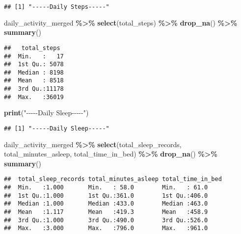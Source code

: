 \documentclass[
]{article}
\newenvironment{Shaded}{\begin{snugshade}}{\end{snugshade}}
\newcommand{\FunctionTok}[1]{\textcolor[rgb]{0.13,0.29,0.53}{\textbf{#1}}}
\newcommand{\NormalTok}[1]{#1}
\newcommand{\SpecialCharTok}[1]{\textcolor[rgb]{0.81,0.36,0.00}{\textbf{#1}}}
\newcommand{\StringTok}[1]{\textcolor[rgb]{0.31,0.60,0.02}{#1}}
\begin{document}
\begin{verbatim}
## [1] "-----Daily Steps-----"
\end{verbatim}

\begin{Shaded}
\begin{Highlighting}[]
\NormalTok{daily\_activity\_merged }\SpecialCharTok{\%\textgreater{}\%} 
  \FunctionTok{select}\NormalTok{(total\_steps) }\SpecialCharTok{\%\textgreater{}\%} 
  \FunctionTok{drop\_na}\NormalTok{() }\SpecialCharTok{\%\textgreater{}\%} 
  \FunctionTok{summary}\NormalTok{()}
\end{Highlighting}
\end{Shaded}

\begin{verbatim}
##   total_steps   
##  Min.   :   17  
##  1st Qu.: 5078  
##  Median : 8198  
##  Mean   : 8518  
##  3rd Qu.:11178  
##  Max.   :36019
\end{verbatim}

\begin{Shaded}
\begin{Highlighting}[]
\FunctionTok{print}\NormalTok{(}\StringTok{"{-}{-}{-}{-}{-}Daily Sleep{-}{-}{-}{-}{-}"}\NormalTok{)}
\end{Highlighting}
\end{Shaded}

\begin{verbatim}
## [1] "-----Daily Sleep-----"
\end{verbatim}

\begin{Shaded}
\begin{Highlighting}[]
\NormalTok{daily\_activity\_merged }\SpecialCharTok{\%\textgreater{}\%} 
  \FunctionTok{select}\NormalTok{(total\_sleep\_records, total\_minutes\_asleep, total\_time\_in\_bed) }\SpecialCharTok{\%\textgreater{}\%} 
  \FunctionTok{drop\_na}\NormalTok{() }\SpecialCharTok{\%\textgreater{}\%} 
  \FunctionTok{summary}\NormalTok{()}
\end{Highlighting}
\end{Shaded}

\begin{verbatim}
##  total_sleep_records total_minutes_asleep total_time_in_bed
##  Min.   :1.000       Min.   : 58.0        Min.   : 61.0    
##  1st Qu.:1.000       1st Qu.:361.0        1st Qu.:406.0    
##  Median :1.000       Median :433.0        Median :463.0    
##  Mean   :1.117       Mean   :419.3        Mean   :458.9    
##  3rd Qu.:1.000       3rd Qu.:490.0        3rd Qu.:526.0    
##  Max.   :3.000       Max.   :796.0        Max.   :961.0
\end{verbatim}
\end{document}
